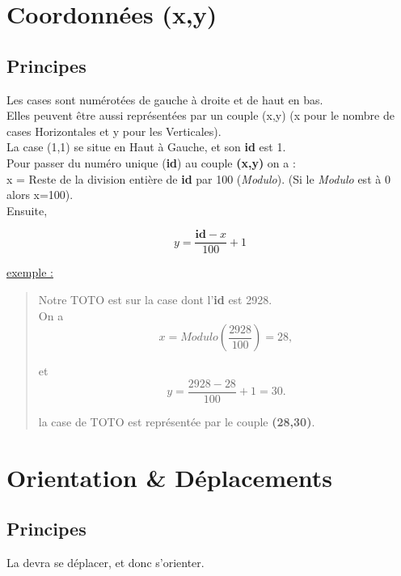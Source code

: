 \documentclass[french]{report}
\begin{document}
\section{Coordonnées (x,y)}\label{coordonnees}

\subsection{Principes}
Les cases sont numérotées de gauche à droite et de haut en bas.\\

Elles peuvent être aussi représentées par un couple (x,y) (x pour le nombre de cases Horizontales et y pour les Verticales).\\
La case (1,1) se situe en Haut à Gauche, et son \textbf{id} est 1.\\

Pour passer du numéro unique (\textbf{id}) au couple \textbf{(x,y)} on a :\\

x = Reste de la division entière de \textbf{id} par 100 (\textit{Modulo}). (Si le \textit{Modulo} est à 0 alors  x=100).\\

Ensuite,

\begin{equation}
y = \frac{\textbf{id} - x}{100} + 1
\end{equation}

\underline{exemple :} \\
\begin{quote}
	Notre \CoCiX TOTO est sur la case dont l'\textbf{id} est 2928.\\
	
	On a \[ x = Modulo(\frac{2928}{100}) = 28,\]
	
	et \[ y =  \frac{2928 - 28}{100} + 1  = 30.\]
	
	la case de TOTO est représentée par le couple \textbf{(28,30)}.
	
\end{quote}

\section{Orientation \& Déplacements}\label{orientation}
\subsection{Principes}
La \CoCiX devra se déplacer, et donc s'orienter.\\
\end{document}
